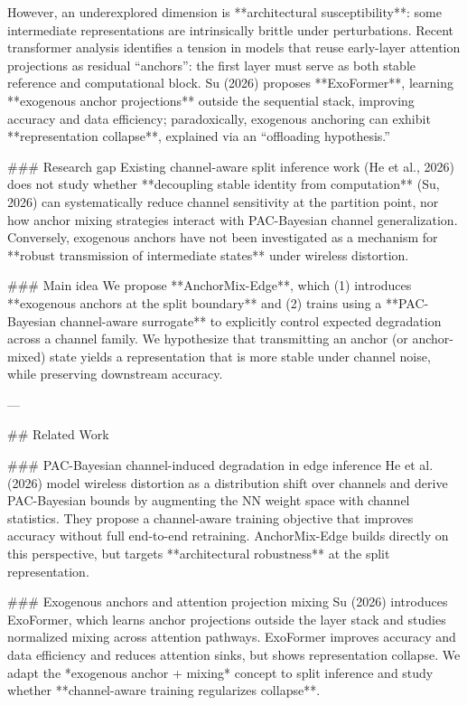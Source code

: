 However, an underexplored dimension is **architectural susceptibility**: some intermediate representations are intrinsically brittle under perturbations. Recent transformer analysis identifies a tension in models that reuse early-layer attention projections as residual “anchors”: the first layer must serve as both stable reference and computational block. Su (2026) proposes **ExoFormer**, learning **exogenous anchor projections** outside the sequential stack, improving accuracy and data efficiency; paradoxically, exogenous anchoring can exhibit **representation collapse**, explained via an “offloading hypothesis.”

### Research gap  
Existing channel-aware split inference work (He et al., 2026) does not study whether **decoupling stable identity from computation** (Su, 2026) can systematically reduce channel sensitivity at the partition point, nor how anchor mixing strategies interact with PAC-Bayesian channel generalization. Conversely, exogenous anchors have not been investigated as a mechanism for **robust transmission of intermediate states** under wireless distortion.

### Main idea  
We propose **AnchorMix-Edge**, which (1) introduces **exogenous anchors at the split boundary** and (2) trains using a **PAC-Bayesian channel-aware surrogate** to explicitly control expected degradation across a channel family. We hypothesize that transmitting an anchor (or anchor-mixed) state yields a representation that is more stable under channel noise, while preserving downstream accuracy.

---

## Related Work  

### PAC-Bayesian channel-induced degradation in edge inference  
He et al. (2026) model wireless distortion as a distribution shift over channels and derive PAC-Bayesian bounds by augmenting the NN weight space with channel statistics. They propose a channel-aware training objective that improves accuracy without full end-to-end retraining. AnchorMix-Edge builds directly on this perspective, but targets **architectural robustness** at the split representation.

### Exogenous anchors and attention projection mixing  
Su (2026) introduces ExoFormer, which learns anchor projections outside the layer stack and studies normalized mixing across attention pathways. ExoFormer improves accuracy and data efficiency and reduces attention sinks, but shows representation collapse. We adapt the *exogenous anchor + mixing* concept to split inference and study whether **channel-aware training regularizes collapse**.


